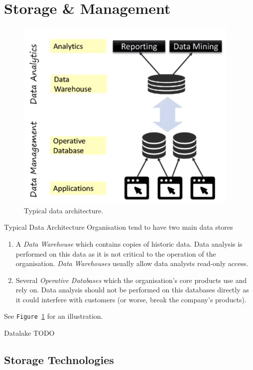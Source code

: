 \documentclass[11pt,a4paper]{article}
\begin{document}
\section{Storage \& Management}\label{sec_storage_and_management}

  \begin{figure}[H]
    \centering
    \includegraphics[width=.7\textwidth]{TypicalDataArchitecture.PNG}
    \caption{Typical data architecture.}
    \label{fig_TypicalDataArchitecture}
  \end{figure}

  \begin{proposition}{Typical Data Architecture}
    Organisation tend to have two main data stores
    \begin{enumerate}
      \item A \textit{Data Warehouse} which contains copies of historic data. Data analysis is performed on this data as it is not critical to the operation of the organisation. \textit{Data Warehouses} usually  allow data analysts read-only access.
      \item Several \textit{Operative Databases} which the organisation's core products use and rely on. Data analysis should not be performed on this databases directly as it could interfere with customers (or worse, break the company's products).
    \end{enumerate}
    See \texttt{Figure \ref{fig_TypicalDataArchitecture}} for an illustration.
  \end{proposition}

  \begin{definition}{Datalake}
    TODO
  \end{definition}

\subsection{Storage Technologies}
\end{document}
